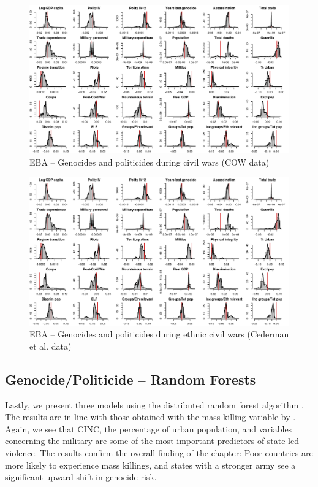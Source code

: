 \clearpage
\begin{figure}
    \centering
    \includegraphics[width=\textwidth]{images/uamk-ucdp.pdf}
    \caption{EBA -- Genocides and politicides during civil wars (COW data)}
    \label{fig:uamk-cow}
\end{figure}
\clearpage

\clearpage
\begin{figure}
    \centering
    \includegraphics[width=\textwidth]{images/uamk-ucdp.pdf}
    \caption{EBA -- Genocides and politicides during ethnic civil wars (Cederman et al. data)}
    \label{fig:uamk-eth}
\end{figure}
\clearpage

\newpage
\subsection{Genocide/Politicide -- Random Forests}

Lastly, we present three models using the distributed random forest algorithm \citep{h2o2017}. The results are in line with those obtained with the mass killing variable by  \citet{ulfelder2008assessing}. Again, we see that CINC, the percentage of urban population, and variables concerning the military are some of the most important predictors of state-led violence. The results confirm the overall finding of the chapter: Poor countries are more likely to experience mass killings, and states with a stronger army see a significant upward shift in genocide risk.

